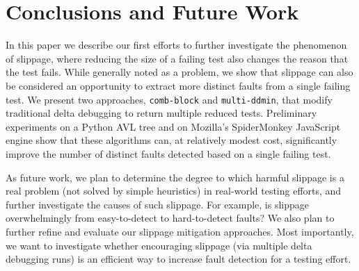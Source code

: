 \section{Conclusions and Future Work}

In this paper we describe our first efforts to further investigate the
phenomenon of slippage, where reducing the size of a failing test also changes
the reason that the test fails.  While generally noted as a problem,
we show that slippage can also be considered an opportunity to extract
more distinct faults from a single failing test.  We present two
approaches, {\tt comb-block} and {\tt multi-ddmin}, that modify
traditional delta debugging to return multiple reduced tests.
Preliminary experiments on a Python AVL tree and on Mozilla's SpiderMonkey
JavaScript engine show that these algorithms can, at relatively
modest cost, significantly improve the number of distinct faults
detected based on a single failing test.

As future work, we plan to determine the degree to which harmful
slippage is a real problem (not solved by simple heuristics) in
real-world testing efforts, and further investigate the causes of such
slippage.  For example, is slippage overwhelmingly from easy-to-detect
to hard-to-detect faults?  We also plan to further refine and evaluate
our slippage mitigation approaches.  Most importantly, we want to
investigate whether encouraging slippage (via multiple delta debugging
runs) is an efficient way to increase fault detection for a testing
effort.
